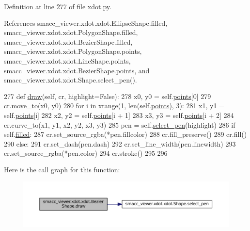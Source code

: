 Definition at line 277 of file xdot.\+py.



References smacc\+\_\+viewer.\+xdot.\+xdot.\+Ellipse\+Shape.\+filled, smacc\+\_\+viewer.\+xdot.\+xdot.\+Polygon\+Shape.\+filled, smacc\+\_\+viewer.\+xdot.\+xdot.\+Bezier\+Shape.\+filled, smacc\+\_\+viewer.\+xdot.\+xdot.\+Polygon\+Shape.\+points, smacc\+\_\+viewer.\+xdot.\+xdot.\+Line\+Shape.\+points, smacc\+\_\+viewer.\+xdot.\+xdot.\+Bezier\+Shape.\+points, and smacc\+\_\+viewer.\+xdot.\+xdot.\+Shape.\+select\+\_\+pen().


\begin{DoxyCode}
277     \textcolor{keyword}{def }\hyperlink{classsmacc__viewer_1_1xdot_1_1xdot_1_1BezierShape_ab0c6c3eaf382700767f150079855e0cc}{draw}(self, cr, highlight=False):
278         x0, y0 = self.\hyperlink{classsmacc__viewer_1_1xdot_1_1xdot_1_1BezierShape_a73bc6ef056c4dff80f8ae562768ad32c}{points}[0]
279         cr.move\_to(x0, y0)
280         \textcolor{keywordflow}{for} i \textcolor{keywordflow}{in} xrange(1, len(self.\hyperlink{classsmacc__viewer_1_1xdot_1_1xdot_1_1BezierShape_a73bc6ef056c4dff80f8ae562768ad32c}{points}), 3):
281             x1, y1 = self.\hyperlink{classsmacc__viewer_1_1xdot_1_1xdot_1_1BezierShape_a73bc6ef056c4dff80f8ae562768ad32c}{points}[i]
282             x2, y2 = self.\hyperlink{classsmacc__viewer_1_1xdot_1_1xdot_1_1BezierShape_a73bc6ef056c4dff80f8ae562768ad32c}{points}[i + 1]
283             x3, y3 = self.\hyperlink{classsmacc__viewer_1_1xdot_1_1xdot_1_1BezierShape_a73bc6ef056c4dff80f8ae562768ad32c}{points}[i + 2]
284             cr.curve\_to(x1, y1, x2, y2, x3, y3)
285         pen = self.\hyperlink{classsmacc__viewer_1_1xdot_1_1xdot_1_1Shape_a447a62283d0acd07b7bca2106d2de6e6}{select\_pen}(highlight)
286         \textcolor{keywordflow}{if} self.\hyperlink{classsmacc__viewer_1_1xdot_1_1xdot_1_1BezierShape_a5beff7e4ce0bb454545896ed8fee7d4d}{filled}:
287             cr.set\_source\_rgba(*pen.fillcolor)
288             cr.fill\_preserve()
289             cr.fill()
290         \textcolor{keywordflow}{else}:
291             cr.set\_dash(pen.dash)
292             cr.set\_line\_width(pen.linewidth)
293             cr.set\_source\_rgba(*pen.color)
294             cr.stroke()
295 
296 
\end{DoxyCode}


Here is the call graph for this function\+:
\nopagebreak
\begin{figure}[H]
\begin{center}
\leavevmode
\includegraphics[width=350pt]{classsmacc__viewer_1_1xdot_1_1xdot_1_1BezierShape_ab0c6c3eaf382700767f150079855e0cc_cgraph}
\end{center}
\end{figure}





